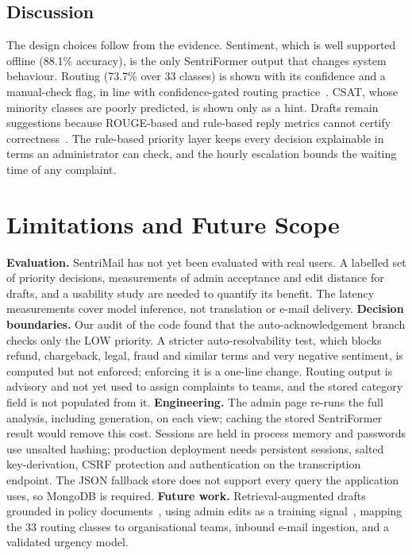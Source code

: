 \documentclass[conference]{IEEEtran}
\begin{document}


\subsection{Discussion}
The design choices follow from the evidence. Sentiment, which is well supported offline (88.1\% accuracy), is the only SentriFormer output that changes system behaviour. Routing (73.7\% over 33 classes) is shown with its confidence and a manual-check flag, in line with confidence-gated routing practice~\cite{mandal2018cognitive}. CSAT, whose minority classes are poorly predicted, is shown only as a hint. Drafts remain suggestions because ROUGE-based and rule-based reply metrics cannot certify correctness~\cite{ji2023survey}. The rule-based priority layer keeps every decision explainable in terms an administrator can check, and the hourly escalation bounds the waiting time of any complaint.

\FloatBarrier
\section{Limitations and Future Scope}
\textbf{Evaluation.} SentriMail has not yet been evaluated with real users. A labelled set of priority decisions, measurements of admin acceptance and edit distance for drafts, and a usability study are needed to quantify its benefit. The latency measurements cover model inference, not translation or e-mail delivery.
\textbf{Decision boundaries.} Our audit of the code found that the auto-acknowledgement branch checks only the LOW priority. A stricter auto-resolvability test, which blocks refund, chargeback, legal, fraud and similar terms and very negative sentiment, is computed but not enforced; enforcing it is a one-line change. Routing output is advisory and not yet used to assign complaints to teams, and the stored category field is not populated from it.
\textbf{Engineering.} The admin page re-runs the full analysis, including generation, on each view; caching the stored SentriFormer result would remove this cost. Sessions are held in process memory and passwords use unsalted hashing; production deployment needs persistent sessions, salted key-derivation, CSRF protection and authentication on the transcription endpoint. The JSON fallback store does not support every query the application uses, so MongoDB is required.
\textbf{Future work.} Retrieval-augmented drafts grounded in policy documents~\cite{lewis2020rag}, using admin edits as a training signal~\cite{zhao2025agent}, mapping the 33 routing classes to organisational teams, inbound e-mail ingestion, and a validated urgency model.
\end{document}

